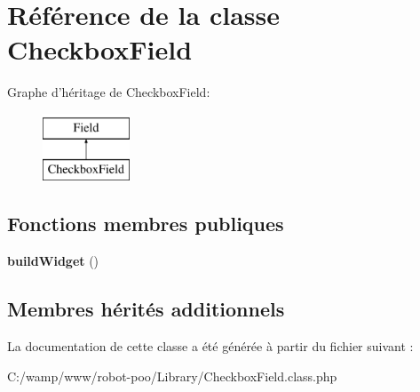 \hypertarget{class_library_1_1_checkbox_field}{\section{Référence de la classe Checkbox\+Field}
\label{class_library_1_1_checkbox_field}
}
Graphe d'héritage de Checkbox\+Field\+:\begin{figure}[H]
\begin{center}
\leavevmode
\includegraphics[height=2.000000cm]{class_library_1_1_checkbox_field}
\end{center}
\end{figure}
\subsection*{Fonctions membres publiques}
\begin{DoxyCompactItemize}
\item 
\hypertarget{class_library_1_1_checkbox_field_a3724547eb0ec2b00884571328d7e2d5d}{{\bfseries build\+Widget} ()}\label{class_library_1_1_checkbox_field_a3724547eb0ec2b00884571328d7e2d5d}

\end{DoxyCompactItemize}
\subsection*{Membres hérités additionnels}


La documentation de cette classe a été générée à partir du fichier suivant \+:\begin{DoxyCompactItemize}
\item 
C\+:/wamp/www/robot-\/poo/\+Library/Checkbox\+Field.\+class.\+php\end{DoxyCompactItemize}
